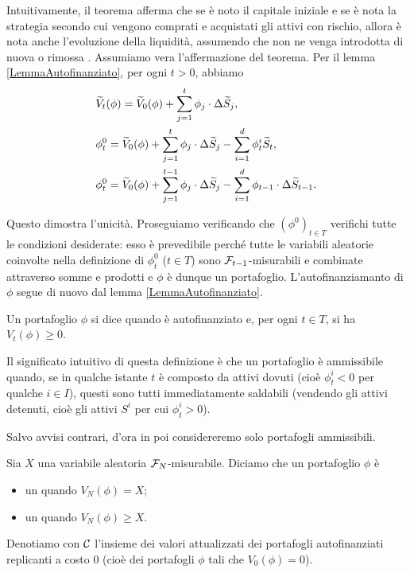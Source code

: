 \par Intuitivamente, il teorema afferma che se \`e noto il capitale iniziale e se \`e nota la strategia secondo cui vengono comprati e acquistati gli attivi con rischio, allora \`e nota anche l'evoluzione della liquidit\`a, assumendo che non ne venga introdotta di nuova o rimossa .
\Proof Assumiamo vera l'affermazione del teorema. Per il lemma \ref{LemmaAutofinanziato}, per ogni $t > 0$, abbiamo
\begin{align}
	&\widetilde{V}_t(\phi) = \widetilde{V}_0(\phi) + \sum_{j = 1}^t \phi_j \cdot \Delta \widetilde{S}_j,\nonumber\\
	&\phi^0_t = \widetilde{V}_0(\phi) + \sum_{j = 1}^t \phi_j \cdot \Delta \widetilde{S}_j - \sum_{i = 1}^d \phi^i_t \widetilde{S}_t,\nonumber\\
	&\phi^0_t = \widetilde{V}_0(\phi) + \sum_{j = 1}^{t - 1} \phi_j \cdot \Delta \widetilde{S}_j - \sum_{i = 1}^d \phi_{t - 1} \cdot \Delta \widetilde{S}_{t - 1}.
\end{align}
\par Questo dimostra l'unicit\`a. Proseguiamo verificando che $(\phi^0)_{t \in T}$ verifichi tutte le condizioni desiderate: esso \`e prevedibile perch\'e tutte le variabili aleatorie coinvolte nella definizione di $\phi^0_t$ ($t \in T$) sono $\mathcal{F}_{t - 1}$-misurabili e combinate attraverso somme e prodotti e $\phi$ \`e dunque un portafoglio. L'autofinanziamanto di $\phi$ segue di nuovo dal lemma \ref{LemmaAutofinanziato}. \EndProof
\begin{Definition}
	Un portafoglio $\phi$ si dice  quando \`e autofinanziato e, per ogni $t \in T$, si ha $V_t(\phi) \geq 0$.
\end{Definition}
\par Il significato intuitivo di questa definizione \`e che un portafoglio \`e ammissibile quando, se in qualche istante $t$ \`e composto da attivi dovuti (cio\`e $\phi^i_t < 0$ per qualche $i \in I$), questi sono tutti immediatamente saldabili (vendendo gli attivi detenuti, cio\`e gli attivi $S^i$ per cui $\phi^i_t > 0$).
\par Salvo avvisi contrari, d'ora in poi considereremo solo portafogli ammissibili.
\begin{Definition}
	Sia $X$ una variabile aleatoria $\mathcal{F}_N$-misurabile. Diciamo che un portafoglio $\phi$ \`e
	\begin{itemize}
		\item un  quando $V_N(\phi) = X$;
		\item un  quando $V_N(\phi) \geq X$.
	\end{itemize}
	Denotiamo con $\mathcal{C}$ l'insieme dei valori attualizzati dei portafogli autofinanziati replicanti a costo $0$ (cio\`e dei portafogli $\phi$ tali che $V_0(\phi) = 0$).
\end{Definition}
